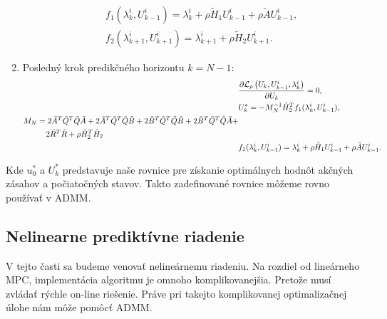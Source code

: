 \begin{enumerate}
{\begin{subequations}
\begin{align}
\begin{split}
				\end{split}\\
				& f_{1}(\lambda_{k}^{i},U_{k-1}^{i}) = \lambda_{k}^{i} + \rho\tilde{H}_{1}U_{k-1}^{i}+\rho\tilde{A}U_{k-1}^{i},\\
				& f_{2}(\lambda_{k+1}^{i},U_{k+1}^{i}) = \lambda_{k+1}^{i} + \rho\tilde{H}_{2}U_{k+1}^{i}.
			\end{align}
		\end{subequations}
	}
		\item{Posledný krok predikčného horizontu $k = N-1$:\\
		\begin{subequations}
			\begin{align}
			&\frac{\partial \mathcal{L}_{\rho}\left(U_{k},U_{k-1}^{i},\lambda_{k}^{i}\right)}{\partial U_{k}} = 0,\\
			&U_{k}^{*} = -M_{N}^{-1}\tilde{H}_{2}^{T}f_{1}(\lambda_{k}^{i},U_{k-1}^{i}),\\
			\begin{split}
			& M_{N} = 2\tilde{A}^{T}\tilde{Q}^{T}\tilde{Q}\tilde{A}+2\tilde{A}^{T}\tilde{Q}^{T}\tilde{Q}\tilde{B}+2\tilde{B}^{T}\tilde{Q}^{T}\tilde{Q}\tilde{B}+2\tilde{B}^{T}\tilde{Q}^{T}\hat{Q}\tilde{A}+\\
			&\hspace{1.0cm}2\tilde{R}^{T}\tilde{R} + \rho\tilde{H}_{2}^{T}\tilde{H}_{2}
			\end{split}\\
			& f_{1}(\lambda_{k}^{i},U_{k-1}^{i}) = \lambda_{k}^{i} + \rho\tilde{H}_{1}U_{k-1}^{i}+\rho\tilde{A}U_{k-1}^{i}.
			\end{align}
		\end{subequations}
	}
\end{enumerate}
Kde $u_{0}^{*}$ a $U_{k}^{*}$ predstavuje naše rovnice pre získanie optimálnych hodnôt akčných zásahov a počiatočných stavov. Takto zadefinované rovnice môžeme rovno používať v ADMM.

\subsection{Nelinearne prediktívne riadenie}
\label{subse:Nelin_MPC_ADMM}
V tejto časti sa budeme venovať nelineárnemu riadeniu. Na rozdiel od lineárneho MPC, implementácia algoritmu je omnoho komplikovanejšia. Pretože musí zvládať rýchle on-line riešenie. Práve pri takejto komplikovanej optimalizačnej úlohe nám môže pomôcť ADMM.

